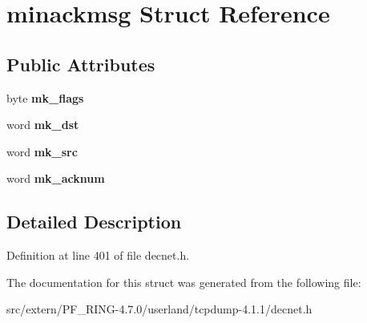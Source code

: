 \hypertarget{structminackmsg}{
\section{minackmsg Struct Reference}
\label{structminackmsg}
}
\subsection*{Public Attributes}
\begin{DoxyCompactItemize}
\item 
\hypertarget{structminackmsg_aafde7fb6a32cad3efc24b334c0a2b878}{
byte {\bfseries mk\_\-flags}}
\label{structminackmsg_aafde7fb6a32cad3efc24b334c0a2b878}

\item 
\hypertarget{structminackmsg_a063c049868a925f5c6b1286274a5b744}{
word {\bfseries mk\_\-dst}}
\label{structminackmsg_a063c049868a925f5c6b1286274a5b744}

\item 
\hypertarget{structminackmsg_a955e8e6f351589f83aaa600c90d05f25}{
word {\bfseries mk\_\-src}}
\label{structminackmsg_a955e8e6f351589f83aaa600c90d05f25}

\item 
\hypertarget{structminackmsg_afc31ee1d4aa68f7aead5d0175c970c61}{
word {\bfseries mk\_\-acknum}}
\label{structminackmsg_afc31ee1d4aa68f7aead5d0175c970c61}

\end{DoxyCompactItemize}


\subsection{Detailed Description}


Definition at line 401 of file decnet.h.



The documentation for this struct was generated from the following file:\begin{DoxyCompactItemize}
\item 
src/extern/PF\_\-RING-\/4.7.0/userland/tcpdump-\/4.1.1/decnet.h\end{DoxyCompactItemize}
